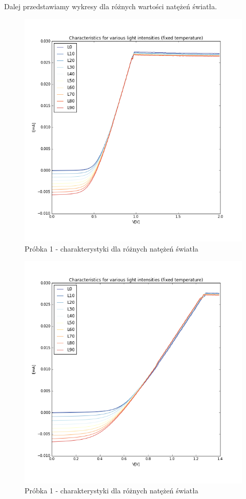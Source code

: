 \documentclass[a4paper,12pt]{article}
\begin{document}
Dalej przedstawiamy wykresy dla różnych wartości natężeń światła.
\begin{figure} [H]
  \begin{center}
    \includegraphics[width = 15cm]{probka1_swiatlo.png}
    \caption{Próbka 1 - charakterystyki dla różnych natężeń światła}
  \end{center}
\end{figure}

\begin{figure} [H]
  \begin{center}
    \includegraphics[width = 15cm]{probka2_swiatlo.png}
    \caption{Próbka 1 - charakterystyki dla różnych natężeń światła}
  \end{center}
\end{figure}
\end{document}

